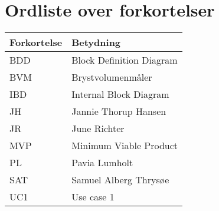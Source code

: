 \section*{Ordliste over forkortelser}

\vspace{1cm}
\begin{table}[hbt]
\centering
\label{ordliste}
\begin{tabular}{|l|l|}
\hline
\textbf{Forkortelse             } & \textbf{Betydning             } \\ \hline
BDD & Block Definition Diagram \\ \hline
BVM & Brystvolumenmåler \\ \hline
IBD & Internal Block Diagram \\ \hline 
JH & Jannie Thorup Hansen \\ \hline
JR & June Richter  \\ \hline
MVP & Minimum Viable Product \\ \hline
PL & Pavia Lumholt \\ \hline
SAT & Samuel Alberg Thrysøe \\ \hline
UC1 & Use case 1 \\ \hline
\end{tabular}
\end{table}